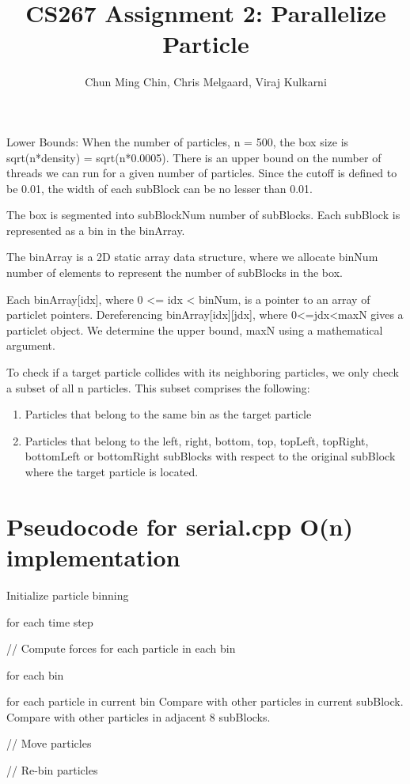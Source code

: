 \documentclass[11pt]{amsart}
\title{CS267 Assignment 2: Parallelize Particle}
\author{Chun Ming Chin, Chris Melgaard, Viraj Kulkarni }
\begin{document}
\maketitle


Lower Bounds:
When the number of particles, n = 500, the box size is sqrt(n*density) = sqrt(n*0.0005). There is an upper bound on the number of threads we can run for a given number of particles. Since the cutoff is defined to be 0.01, the width of each subBlock can be no lesser than 0.01.

The box is segmented into subBlockNum number of subBlocks. Each subBlock is represented as a bin in the binArray.

The binArray is a 2D static array data structure, where we allocate binNum number of elements to represent the number of subBlocks in the box. 

Each binArray[idx], where 0 <= idx < binNum, is a pointer to an array of particlet pointers. Dereferencing binArray[idx][jdx], where 0<=jdx<maxN gives a particlet object. We determine the upper bound, maxN using a mathematical argument. 

To check if a target particle collides with its neighboring particles, we only check a subset of all n particles. This subset comprises the following: 
\begin{enumerate}
\item Particles that belong to the same bin as the target particle
\item Particles that belong to the left, right, bottom, top, topLeft, topRight, bottomLeft or bottomRight subBlocks with respect to the original subBlock where the target particle is located. 
\end{enumerate}


\section{Pseudocode for serial.cpp O(n) implementation}

Initialize particle binning

for each time step {

   // Compute forces for each particle in each bin
   
   for each bin {
   
      for each particle in current bin {
         Compare with other particles in current subBlock.
         Compare with other particles in adjacent 8 subBlocks.
      }    
   }
   
   // Move particles
   
   // Re-bin particles
   
   
}
\end{document}
